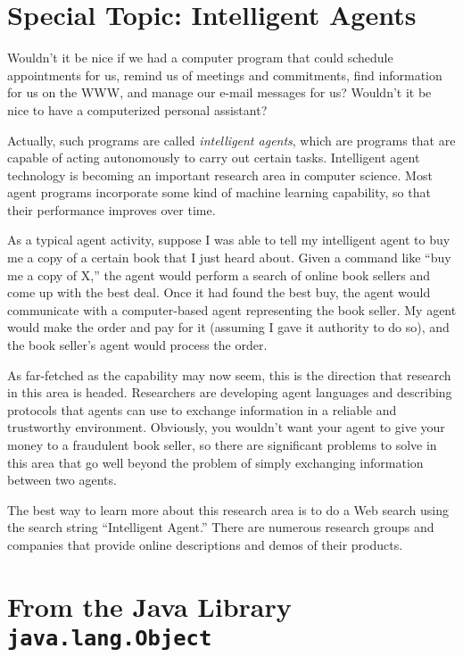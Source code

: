\section*{{\color{cyan}Special Topic:} Intelligent Agents}

{\color{cyan}Wouldn't it be nice} if we had a computer program that
could schedule appointments for us, remind us of meetings and
commitments, find information for us on the WWW, and manage our e-mail
messages for us?  Wouldn't it be nice to have a computerized personal
assistant?

Actually, such programs are called {\it intelligent agents}, which are
programs that are capable of acting autonomously to carry out certain
tasks.  Intelligent agent technology is becoming an important research
area in computer science.  Most agent programs incorporate some kind
of machine learning capability, so that their performance improves
over time.

As a typical agent activity, suppose I was able to tell my intelligent
agent to buy me a copy of a certain book that I just heard about.
Given a command like ``buy me a copy of X,'' the agent would perform a
search of online book sellers and come up with the best deal.  Once it
had found the best buy, the agent would communicate with a
computer-based agent representing the book seller.  My agent would
make the order and pay for it (assuming I gave it authority to do so),
and the book seller's agent would process the order.

As far-fetched as the capability may now seem, this is the direction
that research in this area is headed.  Researchers are developing
agent languages and describing protocols that agents can use to
exchange information in a reliable and trustworthy environment.
Obviously, you wouldn't want your agent to give your money to a
fraudulent book seller, so there are significant problems to solve in
this area that go well beyond the problem of simply exchanging
information between two agents.

The best way to learn more about this research area is to do a Web
search using the search string ``Intelligent Agent.''  There are
numerous research groups and companies that provide online
descriptions and demos of their products.

\section{{\bf From the Java Library} {\tt java.lang.Object}}
\label{sec-tostring}
\WWWjava

